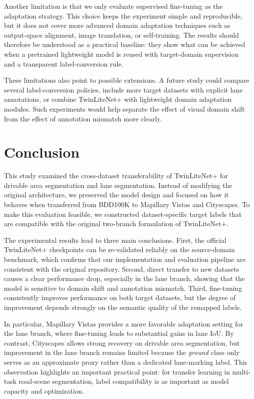 \documentclass[conference]{IEEEtran}
\begin{document}
Another limitation is that we only evaluate supervised fine-tuning as the adaptation strategy. This choice keeps the experiment simple and reproducible, but it does not cover more advanced domain adaptation techniques such as output-space alignment, image translation, or self-training. The results should therefore be understood as a practical baseline: they show what can be achieved when a pretrained lightweight model is reused with target-domain supervision and a transparent label-conversion rule.

These limitations also point to possible extensions. A future study could compare several label-conversion policies, include more target datasets with explicit lane annotations, or combine TwinLiteNet+ with lightweight domain adaptation modules. Such experiments would help separate the effect of visual domain shift from the effect of annotation mismatch more clearly.

\section{Conclusion}
This study examined the cross-dataset transferability of TwinLiteNet+ for drivable area segmentation and lane segmentation. Instead of modifying the original architecture, we preserved the model design and focused on how it behaves when transferred from BDD100K to Mapillary Vistas and Cityscapes. To make this evaluation feasible, we constructed dataset-specific target labels that are compatible with the original two-branch formulation of TwinLiteNet+.

The experimental results lead to three main conclusions. First, the official TwinLiteNet+ checkpoints can be re-validated reliably on the source-domain benchmark, which confirms that our implementation and evaluation pipeline are consistent with the original repository. Second, direct transfer to new datasets causes a clear performance drop, especially in the lane branch, showing that the model is sensitive to domain shift and annotation mismatch. Third, fine-tuning consistently improves performance on both target datasets, but the degree of improvement depends strongly on the semantic quality of the remapped labels.

In particular, Mapillary Vistas provides a more favorable adaptation setting for the lane branch, where fine-tuning leads to substantial gains in lane IoU. By contrast, Cityscapes allows strong recovery on drivable area segmentation, but improvement in the lane branch remains limited because the \textit{ground} class only serves as an approximate proxy rather than a dedicated lane-marking label. This observation highlights an important practical point: for transfer learning in multi-task road-scene segmentation, label compatibility is as important as model capacity and optimization.
\end{document}
